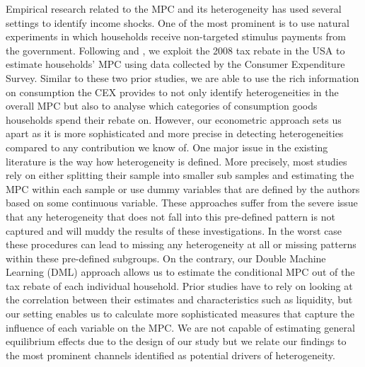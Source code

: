 Empirical research related to the MPC and its heterogeneity has used several settings to identify income shocks. One of the most prominent is to use natural experiments in which households receive non-targeted stimulus payments from the government. Following \cite{parker_etal_13} and \cite{ms_14}, we exploit the 2008 tax rebate in the USA to estimate households' MPC using data collected by the Consumer Expenditure Survey. Similar to these two prior studies, we are able to use the rich information on consumption the CEX provides to not only identify heterogeneities in the overall MPC but also to analyse which categories of consumption goods households spend their rebate on. However, our econometric approach sets us apart as it is more sophisticated and more precise in detecting heterogeneities compared to any contribution we know of. One major issue in the existing literature is the way how heterogeneity is defined. More precisely, most studies rely on either splitting their sample into smaller sub samples and estimating the MPC within each sample or use dummy variables that are defined by the authors based on some continuous variable. These approaches suffer from the severe issue that any heterogeneity that does not fall into this pre-defined pattern is not captured and will muddy the results of these investigations. In the worst case these procedures can lead to missing any heterogeneity at all or missing patterns within these pre-defined subgroups. On the contrary, our Double Machine Learning (DML) approach allows us to estimate the conditional MPC out of the tax rebate of each individual household. Prior studies have to rely on looking at the correlation between their estimates and characteristics such as liquidity, but our setting enables us to calculate more sophisticated measures that capture the influence of each variable on the MPC. We are not capable of estimating general equilibrium effects due to the design of our study but we relate our findings to the most prominent channels identified as potential drivers of heterogeneity. \\
